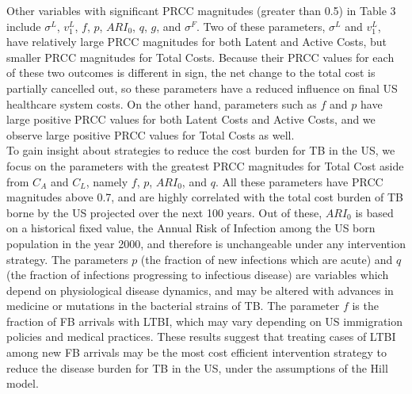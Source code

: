 \documentclass{amsart}
\begin{document}
Other variables with significant PRCC magnitudes (greater than 0.5) in Table 3
include $\sigma^{L}$, $v^{L}_{1}$, $f$, $p$, $ARI_{0}$, $q$, $g$, and
$\sigma^{F}$.  Two of these parameters, $\sigma^{L}$ and $v^{L}_{1}$, have
relatively large PRCC magnitudes for both Latent and Active Costs, but smaller
PRCC magnitudes for Total Costs.  Because their PRCC values for each of these
two outcomes is different in sign, the net change to the total cost is partially
cancelled out, so these parameters have a reduced influence on final US
healthcare system costs.  On the other hand, parameters such as $f$ and $p$ have
large positive PRCC values for both Latent Costs and Active Costs, and we
observe large positive PRCC values for Total Costs as well.\\

To gain insight about strategies to reduce the cost burden for TB in the US, we
focus on the parameters with the greatest PRCC magnitudes for Total Cost aside
from $C_{A}$ and $C_{L}$, namely $f$, $p$, $ARI_{0}$, and $q$.  All these
parameters have PRCC magnitudes above 0.7, and are highly correlated with the
total cost burden of TB borne by the US projected over the next 100 years.  Out
of these, $ARI_{0}$ is based on a historical fixed value, the Annual Risk of
Infection among the US born population in the year 2000, and therefore is
unchangeable under any intervention strategy.  The parameters $p$ (the fraction
of new infections which are acute) and $q$ (the fraction of infections
progressing to infectious disease) are variables which depend on physiological
disease dynamics, and may be altered with advances in medicine or mutations in
the bacterial strains of TB.  The parameter $f$ is the fraction of FB arrivals
with LTBI, which may vary depending on US immigration policies and medical
practices.  These results suggest that treating cases of LTBI among new FB
arrivals may be the most cost efficient intervention strategy to reduce the
disease burden for TB in the US, under the assumptions of the Hill model.  \\
\end{document}
